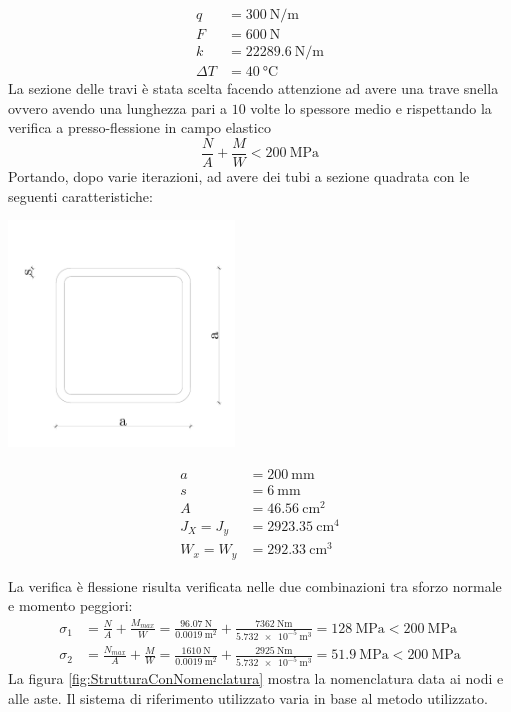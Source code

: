 \begin{align*}
	q &= \SI{300}{\newton \per \metre}\\
	F &= \SI{600}{\newton}\\
	k &= \SI{22289.6}{\newton \per \metre}\\
	\Delta T &= \SI{40}{\celsius}
\end{align*}
La sezione delle travi è stata scelta facendo attenzione ad avere una trave snella ovvero avendo una lunghezza pari a $10$ volte lo spessore medio e rispettando la verifica a presso-flessione in campo elastico 
\[
\frac{N}{A} + \frac{M}{W} < \SI{200}{\mega\pascal}
\]
Portando, dopo varie iterazioni, ad avere dei tubi a sezione quadrata con le seguenti caratteristiche:
\begin{center}
\begin{minipage}{6cm}
	\includegraphics[width=60mm]{rel1/img1/tubi-quadri.pdf}
\end{minipage}
\begin{minipage}{6cm}
	\begin{align*}
		a &= \SI{200}{\milli\metre}\\
		s &= \SI{6}{\milli\metre}\\
		A &= \SI{46.56}{\centi\metre\squared}\\
		J_X = J_y &= \SI{2923.35}{\centi\metre\tothe{4}}\\
		W_x = W_y &= \SI{292.33}{\centi\metre\cubed}
	\end{align*}
\end{minipage}
\end{center}
La verifica è flessione risulta verificata nelle due combinazioni tra sforzo normale e momento peggiori: 
\begin{align*}
    \sigma_1 &= \frac{N}{A} + \frac{M_{max}}{W} = \frac{\SI{96.07}{\newton}}{\SI{0.0019}{\metre\squared}} + \frac{\SI{7362}{\newton\metre}}{\SI{5.732e-5}{\metre\cubed}} = \SI{128}{\mega\pascal}< \SI{200}{\mega\pascal}\\
    \sigma_2 &= \frac{N_{max}}{A} + \frac{M}{W} = \frac{\SI{1610}{\newton}}{\SI{0.0019}{\metre\squared}} + \frac{\SI{2925}{\newton\metre}}{\SI{5.732e-5}{\metre\cubed}} =\SI{51.9}{\mega\pascal} < \SI{200}{\mega\pascal}
\end{align*}
La figura \ref{fig:StrutturaConNomenclatura} mostra la nomenclatura data ai nodi e alle aste. Il sistema di riferimento utilizzato varia in base al metodo utilizzato.

	
    
    
